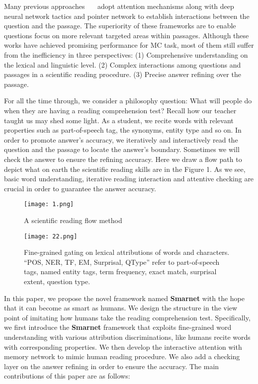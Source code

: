 \documentclass[letterpaper]{article} \usepackage{aaai18}  \usepackage{times}  \usepackage{helvet}  \usepackage{courier}  \usepackage{url}  \usepackage{graphicx}  \usepackage{booktabs}
\begin{document}
Many previous approaches~\cite{seo2016bidirectional}~\cite{Gong2017Ruminating}~\cite{Wang2017GatedSN} adopt attention mechanisms along with deep neural network tactics and pointer network to establish interactions between the question and the passage. The superiority of these frameworks are to enable questions focus on more relevant targeted areas within passages. Although these works have achieved promising performance for MC task, most of them still suffer from the inefficiency in three perspectives: (1) Comprehensive understanding on the lexical and linguistic level. (2) Complex interactions among questions and passages in a scientific reading procedure. (3) Precise answer refining over the passage.

For all the time through, we consider a philosophy question: What will people do when they are having a reading comprehension test? Recall how our teacher taught us may shed some light. As a student, we recite words with relevant properties such as part-of-speech tag, the synonyms, entity type and so on. In order to promote answer's accuracy, we iteratively and interactively read the question and the passage to locate the answer's boundary. Sometimes we will check the answer to ensure the refining accuracy. Here we draw a flow path to depict what on earth the scientific reading skills are in the Figure 1. As we see, basic word understanding, iterative reading interaction and attentive checking are crucial in order to guarantee the answer accuracy.
\begin{figure}[t]
	\centering
	\texttt{[image: 1.png]}
	\caption{A scientific reading flow method}
\end{figure}
 \begin{figure*}[t]
	\centering
	\texttt{[image: 22.png]}
	\caption{Fine-grained gating on lexical attributions of words and characters. ``POS, NER, TF, EM, Surprisal, QType'' refer to part-of-speech tags, named entity tags, term frequency, exact match, surprisal extent, question type.}
\end{figure*}

In this paper, we propose the novel framework named \textbf{Smarnet} with the hope that it can become as smart as humans. We design the structure in the view point of imitating how humans take the reading comprehension test. Specifically, we first introduce the \textbf{Smarnet} framework that exploits fine-grained word understanding with various attribution discriminations, like humans recite words with corresponding properties. We then develop the interactive attention with memory network to mimic human reading procedure. We also add a checking layer on the answer refining in order to ensure the accuracy. The main contributions of this paper are as follows:
\end{document}

